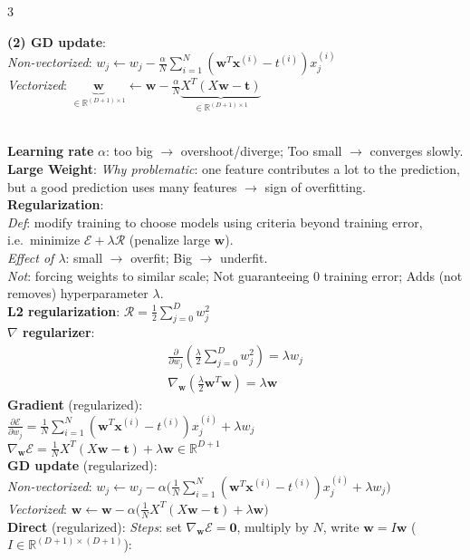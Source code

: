 \documentclass[10pt]{article}
\newcommand{\vx}{\mathbf{x}}
\newcommand{\vw}{\mathbf{w}}
\newcommand{\vt}{\mathbf{t}}
\newcommand{\cE}{\mathcal{E}}
\newcommand{\sub}[1]{\textit{#1}:}  %
\begin{document}
\begin{multicols*}{3}
\begin{minipage}{\linewidth}
\textbf{(2) GD update}:\\
\sub{Non-vectorized} $w_j\leftarrow w_j-\frac{\alpha}{N}\sum_{i=1}^N(\vw^T\vx^{(i)}-t^{(i)})x_j^{(i)}$\\
\sub{Vectorized} $\underbrace{\vw}_{\in\mathbb R^{(D+1)\times1}}\leftarrow\vw-\frac{\alpha}{N}\underbrace{X^T(X\vw-\vt)}_{\in\mathbb R^{(D+1)\times1}}$
\end{minipage}\\
\textbf{Learning rate} $\alpha$: too big $\to$ overshoot/diverge; Too small $\to$ converges slowly.\\
\textbf{Large Weight}: \sub{Why problematic} one feature contributes a lot to the prediction, but a good prediction uses many features $\to$ sign of overfitting.\\
\textbf{Regularization}:\\
\sub{Def} modify training to choose models using criteria beyond training error, i.e.\ minimize $\cE+\lambda\mathcal R$ (penalize large $\vw$).\\
\sub{Effect of $\lambda$} small $\to$ overfit; Big $\to$ underfit.\\
\sub{Not} forcing weights to similar scale; Not guaranteeing 0 training error; Adds (not removes) hyperparameter $\lambda$.\\
\textbf{L2 regularization}: $\mathcal R=\tfrac12\textstyle\sum_{j=0}^D w_j^2$\\
\textbf{$\nabla$ regularizer}:
\begin{gather*}
\frac{\partial}{\partial w_j}\left(\frac{\lambda}{2}\sum_{j=0}^D w_j^2\right) = \lambda w_j\\
\nabla_{\vw}\left(\frac{\lambda}{2}\vw^T\vw\right) = \lambda\vw
\end{gather*}
\textbf{Gradient} (regularized):\\
$\frac{\partial\cE}{\partial w_j}=\frac1N\sum_{i=1}^N(\vw^T\vx^{(i)}-t^{(i)})x_j^{(i)}+\lambda w_j$\\
$\nabla_\vw\cE=\frac1NX^T(X\vw-\vt)+\lambda\vw\in\mathbb R^{D+1}$\\
\textbf{GD update} (regularized):\\
\sub{Non-vectorized} $w_j\leftarrow w_j-\alpha\big(\frac1N\sum_{i=1}^N(\vw^T\vx^{(i)}-t^{(i)})x_j^{(i)}+\lambda w_j\big)$\\
\sub{Vectorized} $\vw\leftarrow\vw-\alpha\big(\frac1NX^T(X\vw-\vt)+\lambda\vw\big)$\\
\textbf{Direct} (regularized): \sub{Steps} set $\nabla_\vw\cE=\mathbf 0$, multiply by $N$, write $\vw=I\vw$ ($I\in\mathbb R^{(D+1)\times(D+1)}$):

\end{multicols*}
\end{document}
